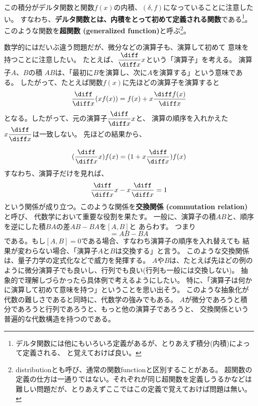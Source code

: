 この積分がデルタ関数と関数$f(x)$の内積、$(\delta,f)$になっていることに注意したい。
すなわち、{\bf デルタ関数とは、内積をとって初めて定義される関数}である\footnote{%
  デルタ関数には他にもいろいろ定義があるが、とりあえず積分(内積)によって定義される、
  と覚えておけば良い。
}。
このような関数を{\bf 超関数 (generalized function)}と呼ぶ\footnote{%
  distributionとも呼び、通常の関数functionと区別することがある。
  超関数の定義の仕方は一通りではない。それぞれが同じ超関数を定義しうるかなどは
  難しい問題だが、とりあえずここではこの定義で覚えておけば問題は無い。
}。

数学的にはだいぶ違う問題だが、微分などの演算子も、演算して初めて
意味を持つことに注意したい。
たとえば、$\displaystyle \frac{\diff}{\diff x} x$という「演算子」を考える。
演算子$A$、$B$の積 $AB$は、「最初に$B$を演算し、次に$A$を演算する」という意味である。
したがって、たとえば関数$f(x)$に先ほどの演算子を演算すると
\begin{equation}
  \frac{\diff}{\diff x} (x f(x)) = f(x) + x \frac{\diff f(x)}{\diff x}
\end{equation}
となる。したがって、元の演算子$\displaystyle \frac{\diff}{\diff x} x$と、
演算の順序を入れかえた$\displaystyle x \frac{\diff}{\diff x}$は一致しない。
先ほどの結果から、

\begin{equation}
  (\frac{\diff}{\diff x} x) f(x)  =  (1 + x \frac{\diff }{\diff x}) f(x)
\end{equation}
すなわち、演算子だけを見れば、
\begin{equation}
  \frac{\diff}{\diff x} x -   x \frac{\diff }{\diff x} =  1
\end{equation}
という関係が成り立つ。このような関係を{\bf 交換関係 (commutation relation)}と呼び、
代数学において重要な役割を果たす。
一般に、演算子の積$AB$と、順序を逆にした積$BA$の差$AB-BA$を$[A,B]$と
あらわす。
つまり
\begin{equation}
  [A,B] = AB - BA
\end{equation}
である。もし$[A,B]=0$である場合、すなわち演算子の順序を入れ替えても
結果が変わらない場合、「演算子$A$と$B$は交換する」と言う。
このような交換関係は、量子力学の定式化などで威力を発揮する。
$A$や$B$は、たとえば先ほどの例のように微分演算子でも良いし、行列でも良い(行列も一般には交換しない)。
抽象的で理解しづらかったら具体例で考えるようにしたい。
特に、「演算子は何かに演算して初めて意味を持つ」ということを思い出そう。
このような抽象化が代数の難しさであると同時に、代数学の強みでもある。
$A$が微分であろうと積分であろうと行列であろうと、もっと他の演算子であろうと、
交換関係という普遍的な代数構造を持つのである。

